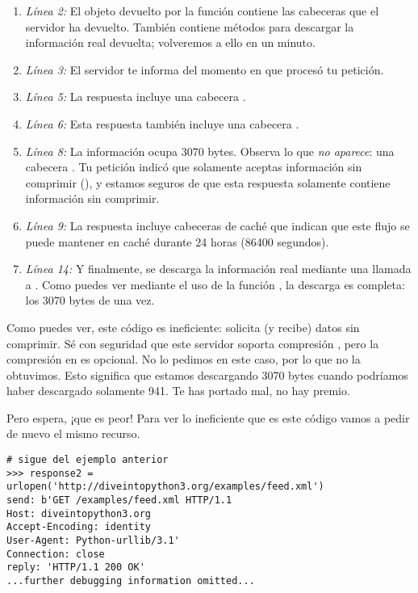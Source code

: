 \begin{enumerate}

\item \emph{Línea 2:} El objeto  devuelto por la función  contiene las cabeceras  que el servidor ha devuelto. También contiene métodos para descargar la información real devuelta; volveremos a ello en un minuto.

\item \emph{Línea 3:} El servidor te informa del momento en que procesó tu petición.

\item \emph{Línea 5:} La respuesta incluye una cabecera .

\item \emph{Línea 6:} Esta respuesta también incluye una cabecera .

\item \emph{Línea 8:} La información ocupa 3070 bytes. Observa lo que \emph{no aparece}: una cabecera . Tu petición indicó que solamente aceptas información sin comprimir (), y estamos seguros de que esta respuesta solamente contiene información sin comprimir.

\item \emph{Línea 9:} La respuesta incluye cabeceras de caché que indican que este flujo se puede mantener en caché durante 24 horas (86400 segundos).

\item \emph{Línea 14:} Y finalmente, se descarga la información real mediante una llamada a . Como puedes ver mediante el uso de la función , la descarga es completa: los 3070 bytes de una vez.

\end{enumerate}

Como puedes ver, este código es ineficiente: solicita (y recibe) datos sin comprimir. Sé con seguridad que este servidor soporta compresión , pero la compresión en  es opcional. No lo pedimos en este caso, por lo que no la obtuvimos. Esto significa que estamos descargando 3070 bytes cuando podríamos haber descargado solamente 941. Te has portado mal, no hay premio.

Pero espera, ¡que es peor! Para ver lo ineficiente que es este código vamos a pedir de nuevo el mismo recurso.

\noindent\begin{minipage}{\textwidth}
\begin{lstlisting}[mathescape=True]
# sigue del ejemplo anterior
>>> response2 = urlopen('http://diveintopython3.org/examples/feed.xml')
send: b'GET /examples/feed.xml HTTP/1.1
Host: diveintopython3.org
Accept-Encoding: identity
User-Agent: Python-urllib/3.1'
Connection: close
reply: 'HTTP/1.1 200 OK'
...further debugging information omitted...
\end{lstlisting}
\end{minipage}

